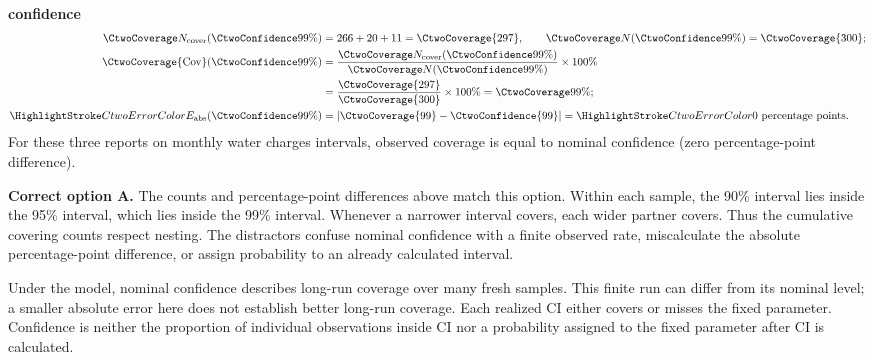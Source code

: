\clearpage
\textbf{ confidence}\nopagebreak[4]
\begin{align*}
\CtwoCoverCount(\CtwoConfidence{99\%})&=266+20+11=\CtwoCoverage{297},
\qquad\CtwoTotalCount(\CtwoConfidence{99\%})=\CtwoCoverage{300};\\
\CtwoCoverage{\mathrm{Cov}}(\CtwoConfidence{99\%})
&=\frac{\CtwoCoverCount(\CtwoConfidence{99\%})}{\CtwoTotalCount(\CtwoConfidence{99\%})}\times100\%
\\
&=\frac{\CtwoCoverage{297}}{\CtwoCoverage{300}}\times100\%=\CtwoCoverage{99\%};\\
\CtwoError{E_{\rm abs}}(\CtwoConfidence{99\%})
&=\left|\CtwoCoverage{99}-\CtwoConfidence{99}\right|=\CtwoError{0}\ \text{percentage points}.
\end{align*}
For these three reports on monthly water charges intervals, observed coverage is equal to nominal confidence (zero percentage-point difference).

\textbf{Correct option A.} The counts and percentage-point differences above match this option. Within each sample, the 90\% interval lies inside the 95\% interval, which lies inside the 99\% interval. Whenever a narrower interval covers, each wider partner covers. Thus the cumulative covering counts respect nesting. The distractors confuse nominal confidence with a finite observed rate, miscalculate the absolute percentage-point difference, or assign probability to an already calculated interval.

Under the model, nominal confidence describes long-run coverage over many fresh samples. This finite run can differ from its nominal level; a smaller absolute error here does not establish better long-run coverage. Each realized $\mathrm{CI}$ either covers or misses the fixed parameter. Confidence is neither the proportion of individual observations inside $\mathrm{CI}$ nor a probability assigned to the fixed parameter after $\mathrm{CI}$ is calculated.
\par\nopagebreak[4]
\par\vspace{3mm}

